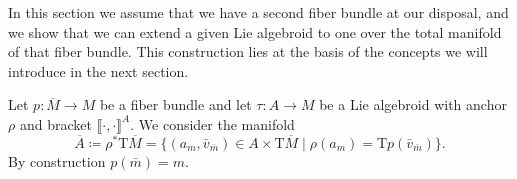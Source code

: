 \documentclass[11pt]{article}
\theoremstyle{plain}
\theoremstyle{definition}
\begin{document}

In this section we assume that we have a second fiber bundle at our disposal, and we show that we can extend a given Lie algebroid to one over the total manifold of that fiber bundle. This construction lies at the basis of the concepts we will introduce in the next section.


Let $p\colon \overline{M}\to M$ be a fiber bundle and let $\tau\colon A\to M$ be a Lie algebroid with anchor $\rho$ and bracket $\llbracket \cdot,\cdot\rrbracket^A$.  We consider the manifold
\begin{equation*}
    \overline{A}\coloneqq \rho^*\mathrm{T}\overline M  = \{ ( a_m, {\bar v}_{\bar m})\in  A\times \mathrm{T}\overline{M} \mid \rho(a_m) = \mathrm{T}p({\bar v}_{\bar m})\}.
\end{equation*}
By construction $p(\bar m) = m$.
 
\end{document}
